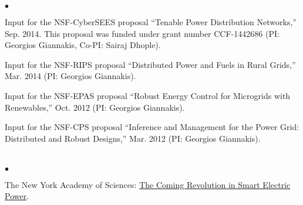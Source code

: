 \documentclass[margin,line]{res}
\newenvironment{list2}{
  \begin{list}{$\bullet$}{%
      \setlength{\itemsep}{0in}
      \setlength{\parsep}{0in} \setlength{\parskip}{0in}
      \setlength{\topsep}{0in} \setlength{\partopsep}{0in}
      \setlength{\leftmargin}{0.10in}}}{\end{list}}
\begin{document}
\begin{resume}
\begin{list2}
\item   Input for the NSF-CyberSEES proposal ``Tenable Power Distribution Networks,'' Sep. 2014.
        This proposal was funded under grant number CCF-1442686 (PI: Georgios Giannakis, Co-PI: Sairaj Dhople).

\item   Input for the NSF-RIPS proposal ``Distributed Power and Fuels in Rural Grids,''
        Mar. 2014 (PI: Georgios Giannakis).

\item   Input for the NSF-EPAS proposal ``Robust Energy Control for Microgrids with Renewables,''
        Oct. 2012 (PI: Georgios Giannakis).

\item   Input for the NSF-CPS proposal ``Inference and Management for the Power Grid: Distributed and Robust Designs,''
        Mar. 2012 (PI: Georgios Giannakis).
\end{list2}

\vspace{.3cm}



\section{}
\begin{list2}

\item  The New York Academy of Sciences: \href{https://www.nyas.org/magazines/imagining-the-next-100-years/imagining-the-next-100-years-of-science-and-technology/}{The Coming Revolution in Smart Electric Power}.

\end{list2}

\vspace{.3cm}




\end{resume}
\end{document}

